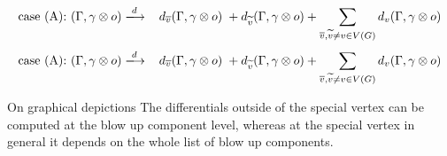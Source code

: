 \[ \text{case (A): } (\Gamma,\gamma\otimes o) \xlongrightarrow{d} \hspace{.3cm} d_{\bar{v}}(\Gamma,\gamma\otimes o) \hspace{.1cm}  + d_{\tilde{v}}(\Gamma,\gamma\otimes o) +\sum_{\bar{v},\tilde{v}\neq v\in V(G)} d_v(\Gamma,\gamma\otimes o) \]
\[ \text{case (A): } (\Gamma,\gamma\otimes o) \xlongrightarrow{d} \hspace{.3cm} d_{\bar{v}}(\Gamma,\gamma\otimes o) \hspace{.1cm}  + d_{\tilde{v}}(\Gamma,\gamma\otimes o) +\sum_{\bar{v},\tilde{v}\neq v\in V(G)} d_v(\Gamma,\gamma\otimes o) \]

On graphical depictions
The differentials outside of the special vertex can be computed at the blow up component level, whereas at the special vertex in general it depends on the whole list of blow up components.
